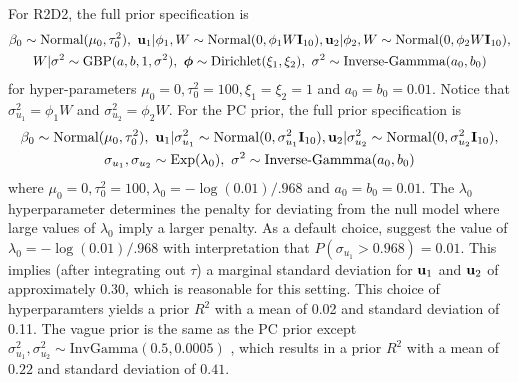 \documentclass[12pt]{article}
\begin{document}
For R2D2, the full prior specification is
\begin{multline}
       \beta_0\sim\mbox{Normal}(\mu_0,\tau_0^2),\
       {\bf u}_1|\phi_1,W\sim\mbox{Normal}(0,\phi_{1} W\bI_{10}),
       {\bf u}_2|\phi_2,W\sim\mbox{Normal}(0,\phi_{2} W\bI_{10}),\\ W|\sigma^2\sim\mbox{GBP}(a,b,1,\sigma^2),\ \bphi\sim\mbox{Dirichlet}(\xi_1,\xi_2),\ \sigma^2\sim\mbox{Inverse-Gammma}(a_0,b_0)
\end{multline}
for hyper-parameters $\mu_0=0,\tau^2_0=100,\xi_1=\xi_2=1$ and $a_0=b_0=0.01$.
Notice that $\sigma^2_{u_1}=\phi_1W$ and $\sigma^2_{u_2}=\phi_2W$.
For the PC prior, the full prior specification is
\begin{multline}
       \beta_0\sim\mbox{Normal}(\mu_0,\tau^2_0),\ {\bf u}_1|\sigma^2_{u_1}\sim\mbox{Normal}(0,\sigma^2_{u_1}\mbox{\bf I}_{10}),
       {\bf u}_2|\sigma^2_{u_2}\sim\mbox{Normal}(0,\sigma^2_{u_2}\mbox{\bf I}_{10}),\\ \sigma_{u_1},\sigma_{u_2}\sim\mbox{Exp}(\lambda_0),\  \sigma^2\sim\mbox{Inverse-Gammma}(a_0,b_0)
\end{multline}
where $\mu_0=0,\tau^2_0=100,\lambda_0=-\log(0.01)/.968$ and $a_0=b_0=0.01$. The $\lambda_0$ hyperparameter determines the penalty for deviating from the null model where large values of $\lambda_0$ imply a larger penalty. As a default choice, \cite{simpson2017penalising} suggest the value of $\lambda_0=-\log(0.01)/.968$ with interpretation that $P(\sigma_{u_1} > 0.968)=0.01$. This implies (after integrating out $\tau$) a marginal standard deviation for ${\bf u}_1$ and ${\bf u}_2$ of approximately 0.30, which is reasonable for this setting. This choice of hyperparamters yields a prior $R^2$ with a mean of 0.02 and standard deviation of 0.11. The vague prior is the same as the PC prior except $\sigma^2_{u_1},\sigma^2_{u_2}\sim\mbox{InvGamma}(0.5,0.0005)$ \citep{winbugs}, which results in a prior $R^2$ with a mean of $0.22$ and standard deviation of $0.41$.
\end{document}
